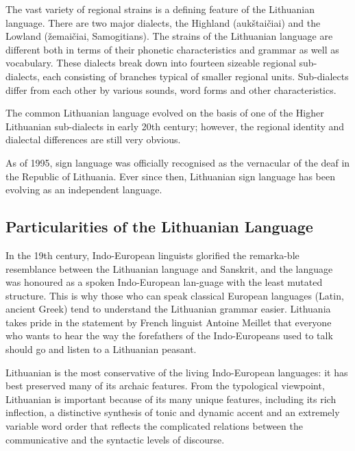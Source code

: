 \begin{multicols}{2}
    The vast variety of regional strains is a defining feature of the Lithuanian language. There are two major dialects, the Highland (aukštaičiai) and the Lowland (žemaičiai, Samogitians). The strains of the Lithuanian language are different both in terms of their phonetic characteristics and grammar as well as vocabulary. These dialects break down into fourteen sizeable regional sub-dialects, each consisting of branches typical of smaller regional units. Sub-dialects differ from each other by various sounds, word forms and other characteristics.

The common Lithuanian language evolved on the basis of one of the Higher Lithuanian sub-dialects in early 20th century; however, the regional identity and dialectal differences are still very obvious.

As of 1995, sign language was officially recognised as the vernacular of the deaf in the Republic of Lithuania. Ever since then, Lithuanian sign language has been evolving as an independent language.

\subsection{Particularities of the Lithuanian  Language}

In the 19th century, Indo-European linguists glorified the remarka-ble resemblance between the Lithuanian language and Sanskrit, and the language was honoured as a spoken Indo-European lan-guage with the least mutated structure. This is why those who can speak classical European languages (Latin, ancient Greek) tend to understand the Lithuanian grammar easier. Lithuania takes pride in the statement by French linguist Antoine Meillet that everyone who wants to hear the way the forefathers of the Indo-Europeans used to talk should go and listen to a Lithuanian peasant.


Lithuanian is the most conservative of the living Indo-European languages: it has best preserved many of its archaic features. From the typological viewpoint, Lithuanian is important because of its many unique features, including its rich inflection, a distinctive synthesis of tonic and dynamic accent and an extremely variable word order that reflects the complicated relations between the communicative and the syntactic levels of discourse.


\end{multicols}

